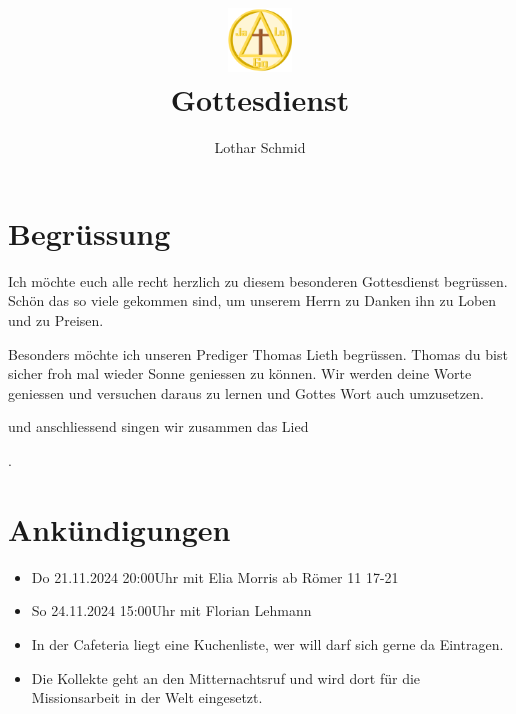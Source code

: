 \documentclass{../inc/mybib}
\title{\includegraphics[height=48pt]{../assets/images/logo.png}\\Gottesdienst}
\author{Lothar Schmid}
\begin{document}
\maketitle
\section{Begrüssung}

Ich möchte euch alle recht herzlich zu diesem besonderen Gottesdienst begrüssen. Schön das so viele gekommen sind, um unserem Herrn zu Danken ihn zu Loben und zu Preisen.

Besonders möchte ich unseren Prediger Thomas Lieth begrüssen. Thomas du bist sicher froh mal wieder Sonne geniessen zu können. Wir werden deine Worte geniessen und versuchen daraus zu lernen und Gottes Wort auch umzusetzen.

\noindent
\beten{} und anschliessend singen wir zusammen das Lied

\noindent
{}.

\section{Ankündigungen}
\begin{itemize}
    \item {} Do 21.11.2024 20:00Uhr mit Elia Morris ab Römer 11 17-21
    \item {} So 24.11.2024 15:00Uhr mit Florian Lehmann
    \item {} In der Cafeteria liegt eine Kuchenliste, wer will darf sich gerne da Eintragen.
    \item {} Die Kollekte geht an den Mitternachtsruf und wird dort für die Missionsarbeit in der Welt eingesetzt.
\end{itemize}
\end{document}
